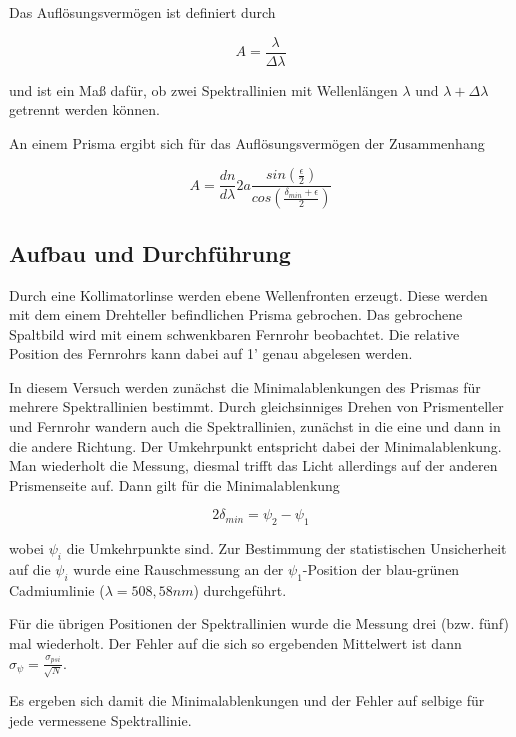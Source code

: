 \documentclass[12pt,a4paper]{article}
\begin{document}
Das Auflösungsvermögen ist definiert durch

\begin{equation}
A = \frac{\lambda}{\Delta \lambda}
\end{equation} 

und ist ein Maß dafür, ob zwei Spektrallinien mit Wellenlängen $\lambda$ und $\lambda + \Delta \lambda$ getrennt werden können.

An einem Prisma ergibt sich für das Auflösungsvermögen der Zusammenhang

\begin{equation}
A = \frac{dn}{d\lambda} 2a \frac{sin(\frac{\epsilon}{2})}{cos(\frac{\delta_{min}+\epsilon}{2})}
\end{equation}





\subsection{Aufbau und Durchführung}
Durch eine Kollimatorlinse werden ebene Wellenfronten erzeugt. Diese werden mit dem einem Drehteller befindlichen Prisma gebrochen. Das gebrochene Spaltbild wird mit einem schwenkbaren Fernrohr beobachtet. Die relative Position des Fernrohrs kann dabei auf 1' genau abgelesen werden.

In diesem Versuch werden zunächst die Minimalablenkungen des Prismas für mehrere Spektrallinien bestimmt.
Durch gleichsinniges Drehen von Prismenteller und Fernrohr wandern auch die Spektrallinien, zunächst in die eine und dann in die andere Richtung. Der Umkehrpunkt entspricht dabei der Minimalablenkung. Man wiederholt die Messung, diesmal trifft das Licht allerdings auf der anderen Prismenseite auf. Dann gilt für die Minimalablenkung

\begin{equation}
2 \delta_{min} = \psi_2-\psi_1
\end{equation}

wobei $\psi_i$ die Umkehrpunkte sind.
Zur Bestimmung der statistischen Unsicherheit auf die $\psi_i$ wurde eine Rauschmessung an der $\psi_1$-Position der blau-grünen Cadmiumlinie ($\lambda=508,58nm$) durchgeführt.

Für die übrigen Positionen der Spektrallinien wurde die Messung drei (bzw. fünf) mal wiederholt. Der Fehler auf die sich so ergebenden Mittelwert ist dann $\sigma_{\psi}=\frac{\sigma_{psi}}{\sqrt{N}}$.

Es ergeben sich damit die Minimalablenkungen und der Fehler auf selbige für jede vermessene Spektrallinie.
\end{document}
